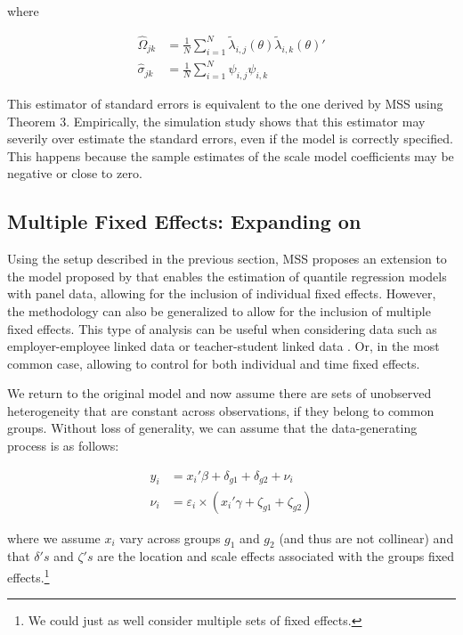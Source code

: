 \documentclass[
  authoryear,
  review,
  1p]{elsarticle}
\begin{document}
where

\[\begin{aligned}
\hat\Omega_{jk} &= \frac{1}{N} \sum_{i=1}^N \tilde \lambda_{i,j}(\theta) \tilde \lambda_{i,k}(\theta)' \\
\hat\sigma_{jk} &= \frac{1}{N} \sum_{i=1}^N \psi_{i,j} \psi_{i,k}
\end{aligned}
\]

This estimator of standard errors is equivalent to the one derived by
MSS using Theorem 3. Empirically, the simulation study shows that this
estimator may severily over estimate the standard errors, even if the
model is correctly specified. This happens because the sample estimates
of the scale model coefficients may be negative or close to zero.

\subsection{\texorpdfstring{Multiple Fixed Effects: Expanding on
\citet{mss2019}}{Multiple Fixed Effects: Expanding on @mss2019}}\label{multiple-fixed-effects-expanding-on-mss2019}

Using the setup described in the previous section, MSS proposes an
extension to the model proposed by \citet{he1997} that enables the
estimation of quantile regression models with panel data, allowing for
the inclusion of individual fixed effects. However, the methodology can
also be generalized to allow for the inclusion of multiple fixed
effects. This type of analysis can be useful when considering data such
as employer-employee linked data \citep{abowed2006} or teacher-student
linked data \citep{harrissass2011}. Or, in the most common case,
allowing to control for both individual and time fixed effects.

We return to the original model and now assume there are sets of
unobserved heterogeneity that are constant across observations, if they
belong to common groups. Without loss of generality, we can assume that
the data-generating process is as follows:

\[\begin{aligned}
  y_{i} &= x_{i}' \beta + \delta_{g1} + \delta_{g2} + \nu_i \\
  \nu_i &= \varepsilon_i \times (x_{i}' \gamma + \zeta_{g1} + \zeta_{g2})   
  \end{aligned}
\]

where we assume \(x_{i}\) vary across groups \(g_1\) and \(g_2\) (and
thus are not collinear) and that \(\delta's\) and \(\zeta's\) are the
location and scale effects associated with the groups fixed
effects.\footnote{We could just as well consider multiple sets of fixed
  effects.}
\end{document}
